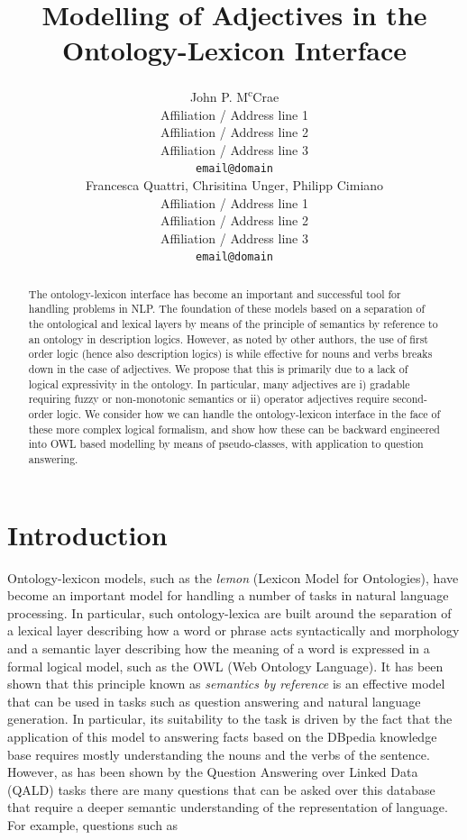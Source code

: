 \documentclass[11pt]{article}
\title{Modelling of Adjectives in the Ontology-Lexicon Interface}
\author{John P. M\textsuperscript{c}Crae \\
  Affiliation / Address line 1 \\
  Affiliation / Address line 2 \\
  Affiliation / Address line 3 \\
  {\tt email@domain} \\\And
  Francesca Quattri, Chrisitina Unger, Philipp Cimiano \\
  Affiliation / Address line 1 \\
  Affiliation / Address line 2 \\
  Affiliation / Address line 3 \\
  {\tt email@domain} \\}
\date{}
\begin{document}
\maketitle
\begin{abstract}
    The ontology-lexicon interface has become an important and successful tool for handling problems in NLP. The foundation of these models based on a separation of the ontological and lexical layers by means of the principle of semantics by reference to an ontology in description logics. However, as noted by other authors, the use of first order logic (hence also description logics) is while effective for nouns and verbs breaks down in the case of adjectives. We propose that this is primarily due to a lack of logical expressivity in the ontology. In particular, many adjectives are i) gradable requiring fuzzy or non-monotonic semantics or ii) operator adjectives require second-order logic. We consider  how we can handle the ontology-lexicon interface in the face of these more complex logical formalism, and show how these can be backward engineered into OWL based modelling by means of pseudo-classes, with application to question answering.
\end{abstract}



\section{Introduction}
\label{intro}

Ontology-lexicon models, such as the \emph{lemon} (Lexicon Model for Ontologies)\cite{mccrae2012interchanging}, have become an important model for handling a number of tasks in natural language processing. In particular, such ontology-lexica are built around the separation of a lexical layer describing how a word or phrase acts syntactically and morphology and a semantic layer describing how the meaning of a word is expressed in a formal logical model, such as the OWL (Web Ontology Language)\cite{mcguinness2004owl}. It has been shown that this principle known as \emph{semantics by reference}\cite{buitelaar2010ontology} is an effective model that can be used in tasks such as question answering\cite{unger2011pythia} and natural language generation\cite{cimiano2013exploiting}. In particular, its suitability to the task is driven by the fact that the application of this model to answering facts based on the DBpedia\cite{auer2007dbpedia} knowledge base requires mostly understanding the nouns and the verbs of the sentence. However, as has been shown by the Question Answering over Linked Data (QALD)\cite{lopez2013evaluating} tasks there are many questions that can be asked over this database that require a deeper semantic understanding of the representation of language. For example, questions such as 
\end{document}
